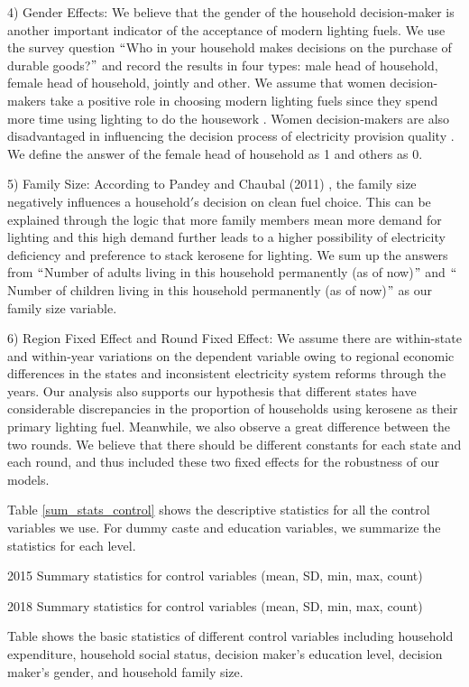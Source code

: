 \documentclass[11pt,english]{article}
\theoremstyle{plain} \newtheorem{claim}{Claim}
\theoremstyle{plain} \newtheorem{prop}{Proposition}
\theoremstyle{plain} \newtheorem{hypo}{Hypothesis}
\begin{document}
4) Gender Effects: We believe that the gender of the household decision-maker is another important indicator of the acceptance of modern lighting fuels. We use the survey question $``$Who in your household makes decisions on the purchase of durable goods?$"$ and record the results in four types: male head of household, female head of household, jointly and other. We assume that women decision-makers take a positive role in choosing modern lighting fuels since they spend more time using lighting to do the housework \citep{Rahutetal2016}. Women decision-makers are also disadvantaged in influencing the decision process of electricity provision quality \citep{Wintheretal2017}. We define the answer of the female head of household as 1 and others as 0.

5) Family Size: According to Pandey and Chaubal (2011) \citep{PandeyChaubal2011}, the family size negatively influences a household$'$s decision on clean fuel choice. This can be explained through the logic that more family members mean more demand for lighting and this high demand further leads to a higher possibility of electricity deficiency and preference to stack kerosene for lighting. We sum up the answers from $``$Number of adults living in this household permanently (as of now)$"$ and $``$Number of children living in this household permanently (as of now)$"$ as our family size variable.


6) Region Fixed Effect and Round Fixed Effect: We assume there are within-state and within-year variations on the dependent variable owing to regional economic differences in the states and inconsistent electricity system reforms through the years. Our analysis also supports our hypothesis that different states have considerable discrepancies in the proportion of households using kerosene as their primary lighting fuel. Meanwhile, we also observe a great difference between the two rounds. We believe that there should be different constants for each state and each round, and thus included these two fixed effects for the robustness of our models.

Table \ref{sum_stats_control} shows the descriptive statistics for all the control variables we use. For dummy caste and education variables, we summarize the statistics for each level.

\begin{table}[ht!]
\centering
\begin{subtable}[b]{\textwidth}
\centering

\caption{2015 Summary statistics for control variables (mean, SD, min, max, count)}
\end{subtable}
\begin{subtable}[b]{\textwidth}
\centering

\caption{2018 Summary statistics for control variables (mean, SD, min, max, count)}
\end{subtable}
\caption{Table shows the basic statistics of different control variables including household expenditure, household social status, decision maker$’$s education level, decision maker$’$s gender, and household family size.}
\label{sum_stats_control}
\end{table}
\end{document}
